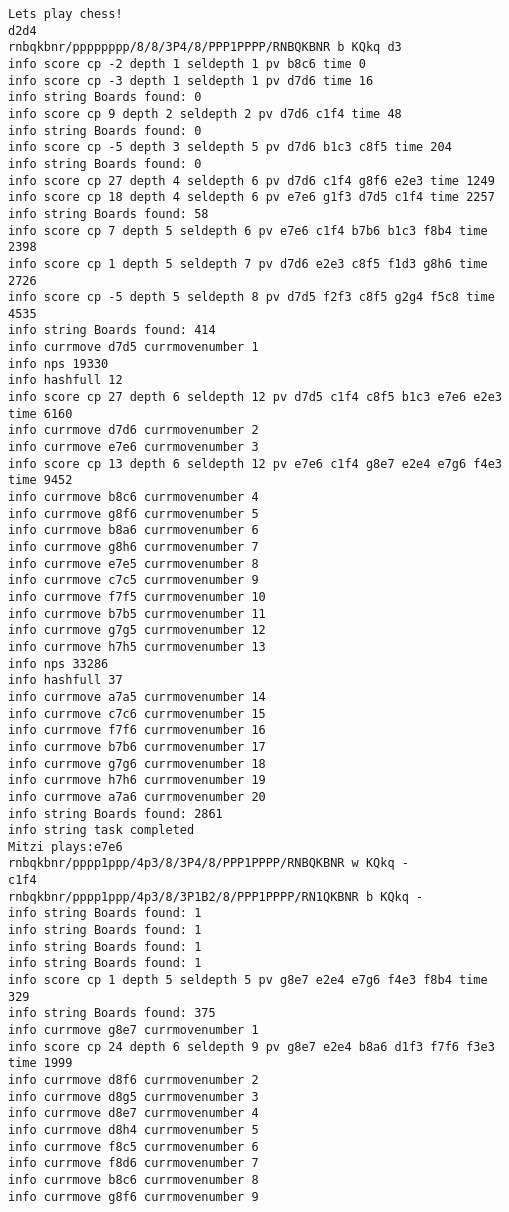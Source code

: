 \documentclass [12pt ,a4paper, english]{scrartcl}
\theoremstyle{plain}
\theoremstyle{definition}
\theoremstyle{remark}
\begin{document}
\begin{lstlisting}
Lets play chess!
d2d4
rnbqkbnr/pppppppp/8/8/3P4/8/PPP1PPPP/RNBQKBNR b KQkq d3
info score cp -2 depth 1 seldepth 1 pv b8c6 time 0
info score cp -3 depth 1 seldepth 1 pv d7d6 time 16
info string Boards found: 0
info score cp 9 depth 2 seldepth 2 pv d7d6 c1f4 time 48
info string Boards found: 0
info score cp -5 depth 3 seldepth 5 pv d7d6 b1c3 c8f5 time 204
info string Boards found: 0
info score cp 27 depth 4 seldepth 6 pv d7d6 c1f4 g8f6 e2e3 time 1249
info score cp 18 depth 4 seldepth 6 pv e7e6 g1f3 d7d5 c1f4 time 2257
info string Boards found: 58
info score cp 7 depth 5 seldepth 6 pv e7e6 c1f4 b7b6 b1c3 f8b4 time 2398
info score cp 1 depth 5 seldepth 7 pv d7d6 e2e3 c8f5 f1d3 g8h6 time 2726
info score cp -5 depth 5 seldepth 8 pv d7d5 f2f3 c8f5 g2g4 f5c8 time 4535
info string Boards found: 414
info currmove d7d5 currmovenumber 1
info nps 19330
info hashfull 12
info score cp 27 depth 6 seldepth 12 pv d7d5 c1f4 c8f5 b1c3 e7e6 e2e3 time 6160
info currmove d7d6 currmovenumber 2
info currmove e7e6 currmovenumber 3
info score cp 13 depth 6 seldepth 12 pv e7e6 c1f4 g8e7 e2e4 e7g6 f4e3 time 9452
info currmove b8c6 currmovenumber 4
info currmove g8f6 currmovenumber 5
info currmove b8a6 currmovenumber 6
info currmove g8h6 currmovenumber 7
info currmove e7e5 currmovenumber 8
info currmove c7c5 currmovenumber 9
info currmove f7f5 currmovenumber 10
info currmove b7b5 currmovenumber 11
info currmove g7g5 currmovenumber 12
info currmove h7h5 currmovenumber 13
info nps 33286
info hashfull 37
info currmove a7a5 currmovenumber 14
info currmove c7c6 currmovenumber 15
info currmove f7f6 currmovenumber 16
info currmove b7b6 currmovenumber 17
info currmove g7g6 currmovenumber 18
info currmove h7h6 currmovenumber 19
info currmove a7a6 currmovenumber 20
info string Boards found: 2861
info string task completed
Mitzi plays:e7e6
rnbqkbnr/pppp1ppp/4p3/8/3P4/8/PPP1PPPP/RNBQKBNR w KQkq -
c1f4
rnbqkbnr/pppp1ppp/4p3/8/3P1B2/8/PPP1PPPP/RN1QKBNR b KQkq -
info string Boards found: 1
info string Boards found: 1
info string Boards found: 1
info string Boards found: 1
info score cp 1 depth 5 seldepth 5 pv g8e7 e2e4 e7g6 f4e3 f8b4 time 329
info string Boards found: 375
info currmove g8e7 currmovenumber 1
info score cp 24 depth 6 seldepth 9 pv g8e7 e2e4 b8a6 d1f3 f7f6 f3e3 time 1999
info currmove d8f6 currmovenumber 2
info currmove d8g5 currmovenumber 3
info currmove d8e7 currmovenumber 4
info currmove d8h4 currmovenumber 5
info currmove f8c5 currmovenumber 6
info currmove f8d6 currmovenumber 7
info currmove b8c6 currmovenumber 8
info currmove g8f6 currmovenumber 9

\end{lstlisting}
\end{document}
